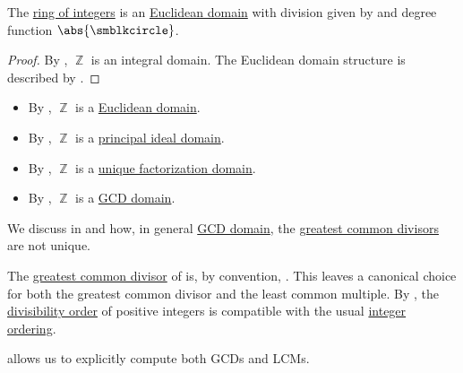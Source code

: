 \begin{proposition}\label{thm:integers_are_euclidean_domain}
  The \hyperref[def:integers]{ring of integers} is an \hyperref[def:euclidean_domain]{Euclidean domain} with division given by  and degree function \( \abs{\anon} \).
\end{proposition}
\begin{proof}
  By , \( \BbbZ \) is an integral domain. The Euclidean domain structure is described by .
\end{proof}

\begin{remark}\label{rem:integer_domain_chain}\hfill
  \begin{itemize}
    \item By , \( \BbbZ \) is a \hyperref[def:euclidean_domain]{Euclidean domain}.
    \item By , \( \BbbZ \) is a \hyperref[def:principal_ideal_domain]{principal ideal domain}.
    \item By , \( \BbbZ \) is a \hyperref[def:unique_factorization_domain]{unique factorization domain}.
    \item By , \( \BbbZ \) is a \hyperref[def:gcd_domain]{GCD domain}.
  \end{itemize}
\end{remark}

\begin{remark}\label{rem:integer_gcd}
  We discuss in  and  how, in general \hyperref[def:gcd_domain]{GCD domain}, the \hyperref[def:gcd_and_lcm]{greatest common divisors} are not unique.

  The \hyperref[def:gcd_and_lcm]{greatest common divisor} of is, by convention, . This leaves a canonical choice for both the greatest common divisor and the least common multiple. By , the \hyperref[thm:semiring_divisibility_order]{divisibility order} of positive integers is compatible with the usual \hyperref[def:integer_ordering]{integer ordering}.

   allows us to explicitly compute both GCDs and LCMs.
\end{remark}

